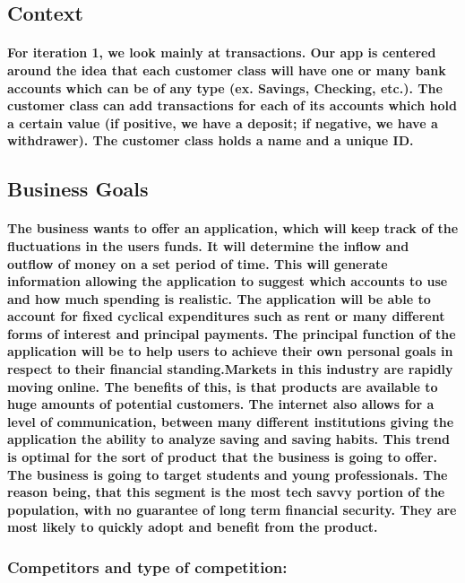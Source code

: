 \documentclass{article}
\begin{document}
\subsection{Context}
\paragraph{\indent For iteration 1, we look mainly at transactions. Our app is centered around the idea that each customer class will have one or many bank accounts which can be of any type (ex. Savings, Checking, etc.). The customer class can add transactions for each of its accounts which hold a certain value (if positive, we have a deposit; if negative, we have a withdrawer). The customer class holds a name and a unique ID.}

\subsection{Business Goals}
\paragraph{\indent The business wants to offer an application, which will keep track of the fluctuations in the users funds.  It will determine the inflow and outflow of money on a set period of time.  This will generate information allowing the application to suggest which accounts to use and how much spending is realistic.  The application will be able to account for fixed cyclical expenditures such as rent or many different forms of interest and principal payments.  The principal function of the application will be to help users to achieve their own personal goals in respect to their financial standing.\newline \newline Markets in this industry are rapidly moving online.  The benefits of this, is that products are available to huge amounts of potential customers. The internet also allows for a level of communication, between many different institutions giving the application the ability to analyze saving and saving habits.  This trend is optimal for the sort of product that the business is going to offer. The business is going to target students and young professionals.  The reason being, that this segment is the most tech savvy portion of the population, with no guarantee of long term financial security.  They are most likely to quickly adopt and benefit from the product.   
}

\subsubsection{Competitors and type of competition:}
\end{document}
